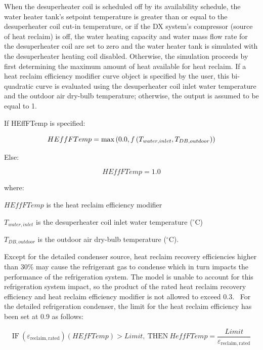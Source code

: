 When the desuperheater coil is scheduled off by its availability schedule, the water heater tank's setpoint temperature is greater than or equal to the desuperheater coil cut-in temperature, or if the DX system's compressor (source of heat reclaim) is off, the water heating capacity and water mass flow rate for the desuperheater coil are set to zero and the water heater tank is simulated with the desuperheater heating coil disabled. Otherwise, the simulation proceeds by first determining the maximum amount of heat available for heat reclaim. If a heat reclaim efficiency modifier curve object is specified by the user, this bi-quadratic curve is evaluated using the desuperheater coil inlet water temperature and the outdoor air dry-bulb temperature; otherwise, the output is assumed to be equal to 1.

If HEffFTemp is specified:

\begin{equation}
  HEffFTemp = \max\left(0.0, f\left(T_{water,inlet},T_{DB,outdoor}\right)\right)
\end{equation}

Else:

\begin{equation}
  HEffFTemp = 1.0
\end{equation}

where:

\(HEffFTemp\) is the heat reclaim efficiency modifier

\({T_{water,inlet}}\) is the desuperheater coil inlet water temperature (\(^{\circ}\)C)

\({T_{DB,outdoor}}\) is the outdoor air dry-bulb temperature (\(^{\circ}\)C).

Except for the detailed condenser source, heat reclaim recovery efficiencies higher than 30\% may cause the refrigerant gas to condense which in turn impacts the performance of the refrigeration system. The model is unable to account for this refrigeration system impact, so the product of the rated heat reclaim recovery efficiency and heat reclaim efficiency modifier is not allowed to exceed 0.3.~ For the detailed refrigeration condenser, the limit for the heat reclaim efficiency has been set at 0.9 as follows:

\begin{equation}
{\mathrm{IF~}}\left( {{\varepsilon_{{\mathrm{reclaim,rated}}}}} \right)\left( {HEfFTemp} \right) > Limit,{\mathrm{~THEN~}}HeffFTemp = \frac{{Limit}}{{{\varepsilon_{{\mathrm{reclaim,rated}}}}}}
\end{equation}

